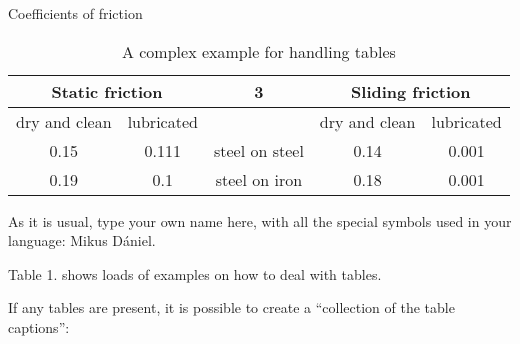 \documentclass{article}
\begin{document}
\begin{table}[]
    \caption{A complex example for handling tables}
    \centering
    \renewcommand{\caption}[1]{#1}
   \caption{Coefficients of friction} \\
    \begin{tabular}{|c|c|c|c|c|}
    \hline
    \hline
        \multicolumn{2}{|c|}{Static friction} & 3 & \multicolumn{2}{|c|}{Sliding friction}  \\
        \hline 
        \hline
        dry and clean  & lubricated &  & dry and clean & lubricated  \\
        \hline
        \hline
        0.15 & 0.111 & steel on steel & 0.14 & 0.001  \\
        \hline
        \hline
        0.19  & 0.1 & steel on iron & 0.18 & 0.001 \\
        \hline
        \hline
    \end{tabular}
    \label{tab:my_label}
\end{table}
\par
As it is usual, type your own name here, with all the special symbols used in your language: Mikus Dániel. \par
Table 1. shows loads of examples on how to deal with tables. \par
If any tables are present, it is possible to create a “collection of the table captions”:
\listoftables
\end{document}
